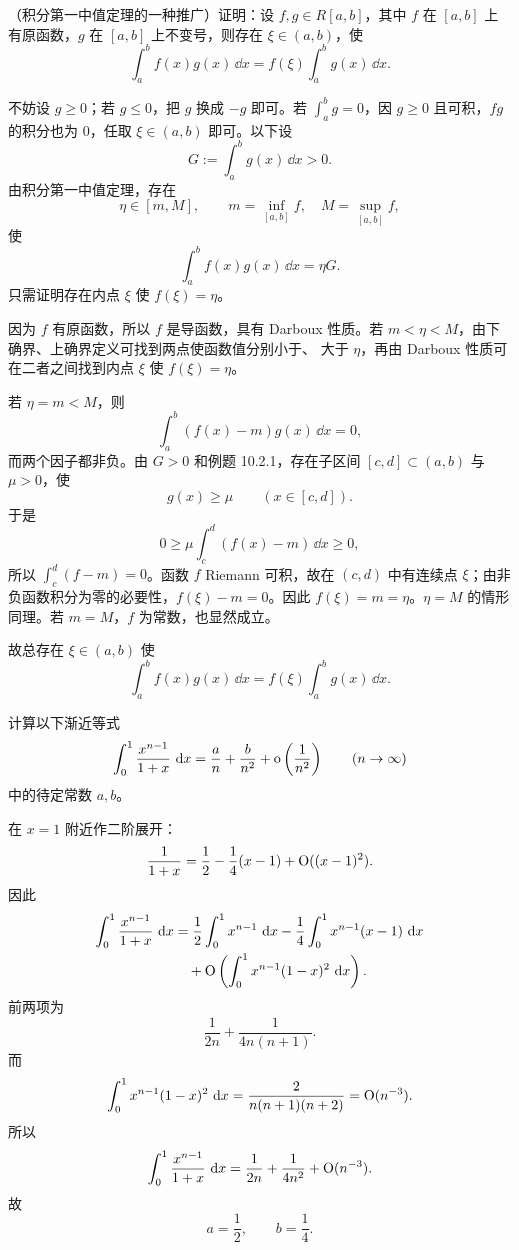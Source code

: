 \begin{xreferenceproblem}[11]
（积分第一中值定理的一种推广）证明：设 $f,g\in R[a,b]$，其中 $f$ 在 $[a,b]$ 上有原函数，$g$ 在 $[a,b]$ 上不变号，则存在 $\xi\in(a,b)$，使
\[
  \int_a^b f(x)g(x)\,\dd x=f(\xi)\int_a^b g(x)\,\dd x.
\]
\end{xreferenceproblem}
\begin{xsolution}
不妨设 $g\geqslant0$；若 $g\leqslant0$，把 $g$ 换成 $-g$ 即可。若 $\int_a^b g=0$，因 $g\geqslant0$ 且可积，$fg$ 的积分也为 $0$，任取 $\xi\in(a,b)$ 即可。以下设
\[
  G:=\int_a^b g(x)\,\dd x>0.
\]
由积分第一中值定理，存在
\[
  \eta\in[m,M],
  \qquad
  m=\inf_{[a,b]}f,\quad M=\sup_{[a,b]}f,
\]
使
\[
  \int_a^b f(x)g(x)\,\dd x=\eta G.
\]
只需证明存在内点 $\xi$ 使 $f(\xi)=\eta$。

因为 $f$ 有原函数，所以 $f$ 是导函数，具有 Darboux 性质。若 $m<\eta<M$，由下确界、上确界定义可找到两点使函数值分别小于、 大于 $\eta$，再由 Darboux 性质可在二者之间找到内点 $\xi$ 使 $f(\xi)=\eta$。

若 $\eta=m<M$，则
\[
  \int_a^b(f(x)-m)g(x)\,\dd x=0,
\]
而两个因子都非负。由 $G>0$ 和例题 10.2.1，存在子区间 $[c,d]\subset(a,b)$ 与 $\mu>0$，使
\[
  g(x)\geqslant\mu\qquad(x\in[c,d]).
\]
于是
\[
  0\geqslant\mu\int_c^d(f(x)-m)\,\dd x\geqslant0,
\]
所以 $\int_c^d(f-m)=0$。函数 $f$ Riemann 可积，故在 $(c,d)$ 中有连续点 $\xi$；由非负函数积分为零的必要性，$f(\xi)-m=0$。因此 $f(\xi)=m=\eta$。$\eta=M$ 的情形同理。若 $m=M$，$f$ 为常数，也显然成立。

故总存在 $\xi\in(a,b)$ 使
\[
  \boxed{\int_a^b f(x)g(x)\,\dd x
  =f(\xi)\int_a^b g(x)\,\dd x}.
\]
\end{xsolution}


\begin{xreferenceproblem}[12]
计算以下渐近等式
\[
  \int_0^1\frac{x^{n-1}}{1+x}\,\mathop{}\!\mathrm{d} x
  =\frac an+\frac b{n^2}+\mathrm{o}\left(\frac1{n^2}\right)
  \qquad(n\to\infty)
\]
中的待定常数 $a,b$。
\end{xreferenceproblem}
\begin{xsolution}
在 $x=1$ 附近作二阶展开：
\[
  \frac1{1+x}
  =\frac12-\frac14(x-1)+\mathrm{O}((x-1)^2).
\]
因此
\begin{align*}
  \int_0^1\frac{x^{n-1}}{1+x}\,\mathop{}\!\mathrm{d} x
  &=\frac12\int_0^1x^{n-1}\,\mathop{}\!\mathrm{d} x
  -\frac14\int_0^1x^{n-1}(x-1)\,\mathop{}\!\mathrm{d} x\\
  &\quad+\mathrm{O}\left(\int_0^1x^{n-1}(1-x)^2\,\mathop{}\!\mathrm{d} x\right).
\end{align*}
前两项为
\[
  \frac1{2n}
  +\frac1{4n(n+1)}.
\]
而
\[
  \int_0^1x^{n-1}(1-x)^2\,\mathop{}\!\mathrm{d} x
  =\frac{2}{n(n+1)(n+2)}=\mathrm{O}(n^{-3}).
\]
所以
\[
  \int_0^1\frac{x^{n-1}}{1+x}\,\mathop{}\!\mathrm{d} x
  =\frac1{2n}+\frac1{4n^2}+\mathrm{O}(n^{-3}).
\]
故
\[
  \boxed{a=\frac12,\qquad b=\frac14}.
\]
\end{xsolution}


